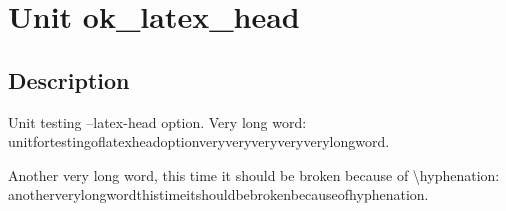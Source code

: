 \documentclass{report}
\begin{document}
\label{toc}\tableofcontents
\newpage
\newlength{\tmplength}
\chapter{Unit ok{\_}latex{\_}head}
\label{ok_latex_head}
\section{Description}
Unit testing --latex{-}head option. Very long word: unitfortestingoflatexheadoptionveryveryveryveryverylongword.

Another very long word, this time it should be broken because of {\textbackslash}hyphenation: anotherverylongwordthistimeitshouldbebrokenbecauseofhyphenation.
\end{document}
